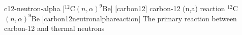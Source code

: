 \newglsXreaction%
{c12-neutron-alpha}%
[{}$^{12}$C$(n,\alpha)^9$Be]%
[carbon12]%
{carbon-12 (n,a) reaction}%
{{}$^{12}$C$(n,\alpha)^9$Be}%
[carbon12neutronalphareaction]%
{The primary reaction between carbon-12 and thermal neutrons}%